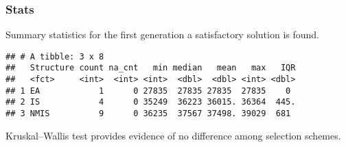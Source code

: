 \documentclass[]{book}
\newenvironment{Shaded}{\begin{snugshade}}{\end{snugshade}}
\newcommand{\CharTok}[1]{\textcolor[rgb]{0.31,0.60,0.02}{#1}}
\newcommand{\DataTypeTok}[1]{\textcolor[rgb]{0.13,0.29,0.53}{#1}}
\newcommand{\DecValTok}[1]{\textcolor[rgb]{0.00,0.00,0.81}{#1}}
\newcommand{\KeywordTok}[1]{\textcolor[rgb]{0.13,0.29,0.53}{\textbf{#1}}}
\newcommand{\NormalTok}[1]{#1}
\newcommand{\OperatorTok}[1]{\textcolor[rgb]{0.81,0.36,0.00}{\textbf{#1}}}
\newcommand{\OtherTok}[1]{\textcolor[rgb]{0.56,0.35,0.01}{#1}}
\newcommand{\StringTok}[1]{\textcolor[rgb]{0.31,0.60,0.02}{#1}}
\begin{document}
\hypertarget{stats-79}{%
\subsubsection{Stats}\label{stats-79}}

Summary statistics for the first generation a satisfactory solution is found.

\begin{Shaded}
\end{Shaded}

\begin{verbatim}
## # A tibble: 3 x 8
##   Structure count na_cnt   min median   mean   max   IQR
##   <fct>     <int>  <int> <int>  <dbl>  <dbl> <int> <dbl>
## 1 EA            1      0 27835  27835 27835  27835    0 
## 2 IS            4      0 35249  36223 36015. 36364  445.
## 3 NMIS          9      0 36235  37567 37498. 39029  681
\end{verbatim}

Kruskal--Wallis test provides evidence of no difference among selection schemes.
\end{document}
